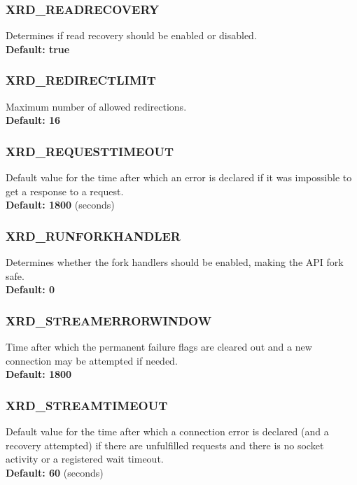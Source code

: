 \documentclass{article}
\begin{document}
		\subsubsection{XRD_READRECOVERY}
		\label{env:readrecovery}
		    Determines if read recovery should be enabled or disabled. \\
		    \textbf{Default: true}
		
		\subsubsection{XRD_REDIRECTLIMIT}
		\label{env:redirectlimit}
		    Maximum number of allowed redirections. \\
		    \textbf{Default: 16}
		    
		\subsubsection{XRD_REQUESTTIMEOUT}
		\label{env:requesttimeout}
		    Default value for the time after which an error is declared if it was impossible to get a response to a 
		    request. \\
		    \textbf{Default: 1800} (seconds)
		    
		\subsubsection{XRD_RUNFORKHANDLER}
		\label{env:runforkhandler}
		    Determines whether the fork handlers should be enabled, making the API fork safe. \\
		    \textbf{Default: 0}
		    
		\subsubsection{XRD_STREAMERRORWINDOW}
		\label{env:streamerrorwindow}
		    Time after which the permanent failure flags are cleared out and a new connection may be attempted if needed. \\
		    \textbf{Default: 1800}
		    
		\subsubsection{XRD_STREAMTIMEOUT}
		\label{env:streamtimeout}
		    Default value for the time after which a connection error is declared (and a recovery attempted) if there are 
		    unfulfilled requests and there is no socket activity or a registered wait timeout. \\
		    \textbf{Default: 60} (seconds)
		    
\end{document}
